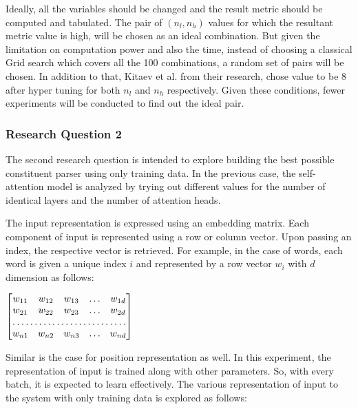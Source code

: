 \documentclass[a4paper, 11pt]{article}
\begin{document}
Ideally, all the variables should be changed and the result metric should be computed and tabulated. The pair of $(n_l,n_h)$ values for which the resultant metric value is high, will be chosen as an ideal combination. But given the limitation on computation power and also the time, instead of choosing a classical Grid search which covers all the 100 combinations, a random set of pairs will be chosen. In addition to that, Kitaev et al. from their research, chose value to be 8 after hyper tuning for both $n_l$ and $n_h$ respectively. Given these conditions, fewer experiments will be conducted to find out the ideal pair.

\subsubsection{Research Question 2}

The second research question is intended to explore building the best possible constituent parser using only training data. In the previous case, the self-attention model is analyzed by trying out different values for the number of identical layers and the number of attention heads. 

The input representation is expressed using an embedding matrix. Each component of input is represented using a row or column vector. Upon passing an index, the respective vector is retrieved. For example, in the case of words, each word is given a unique index $i$ and represented by a row vector $w_i$ with $d$ dimension as follows:

\begin{center}
$\begin{bmatrix}
    w_{11}       & w_{12} & w_{13} & \dots & w_{1d} \\
    w_{21}       & w_{22} & w_{23} & \dots & w_{2d} \\
    \hdotsfor{5} \\
    w_{n1}       & w_{n2} & w_{n3} & \dots & w_{nd}
\end{bmatrix}
$

\end{center}

Similar is the case for position representation as well. In this experiment, the representation of input is trained along with other parameters. So, with every batch, it is expected to learn effectively. The various representation of input to the system with only training data is explored as follows:
\end{document}
